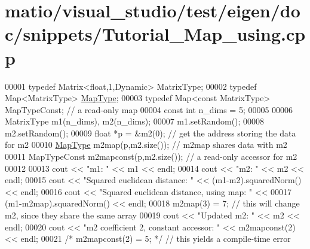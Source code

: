 \hypertarget{matio_2visual__studio_2test_2eigen_2doc_2snippets_2_tutorial___map__using_8cpp_source}{}\section{matio/visual\+\_\+studio/test/eigen/doc/snippets/\+Tutorial\+\_\+\+Map\+\_\+using.cpp}
\label{matio_2visual__studio_2test_2eigen_2doc_2snippets_2_tutorial___map__using_8cpp_source}

\begin{DoxyCode}
00001 \textcolor{keyword}{typedef} Matrix<float,1,Dynamic> MatrixType;
00002 \textcolor{keyword}{typedef} Map<MatrixType> \hyperlink{group___core___module_class_eigen_1_1_map}{MapType};
00003 \textcolor{keyword}{typedef} Map<const MatrixType> MapTypeConst;   \textcolor{comment}{// a read-only map}
00004 \textcolor{keyword}{const} \textcolor{keywordtype}{int} n\_dims = 5;
00005   
00006 MatrixType m1(n\_dims), m2(n\_dims);
00007 m1.setRandom();
00008 m2.setRandom();
00009 \textcolor{keywordtype}{float} *p = &m2(0);  \textcolor{comment}{// get the address storing the data for m2}
00010 \hyperlink{group___core___module_class_eigen_1_1_map}{MapType} m2map(p,m2.size());   \textcolor{comment}{// m2map shares data with m2}
00011 MapTypeConst m2mapconst(p,m2.size());  \textcolor{comment}{// a read-only accessor for m2}
00012 
00013 cout << \textcolor{stringliteral}{"m1: "} << m1 << endl;
00014 cout << \textcolor{stringliteral}{"m2: "} << m2 << endl;
00015 cout << \textcolor{stringliteral}{"Squared euclidean distance: "} << (m1-m2).squaredNorm() << endl;
00016 cout << \textcolor{stringliteral}{"Squared euclidean distance, using map: "} <<
00017   (m1-m2map).squaredNorm() << endl;
00018 m2map(3) = 7;   \textcolor{comment}{// this will change m2, since they share the same array}
00019 cout << \textcolor{stringliteral}{"Updated m2: "} << m2 << endl;
00020 cout << \textcolor{stringliteral}{"m2 coefficient 2, constant accessor: "} << m2mapconst(2) << endl;
00021 \textcolor{comment}{/* m2mapconst(2) = 5; */}   \textcolor{comment}{// this yields a compile-time error}
\end{DoxyCode}
